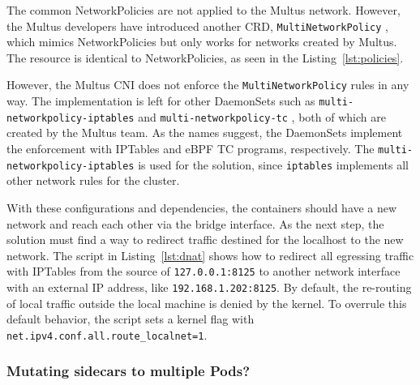 \documentclass[english, 12pt, a4paper, sci, utf8, a-2b, online]{aaltothesis}
\begin{document}


The common NetworkPolicies are not applied to the Multus network.
However, the Multus developers have introduced another CRD, \texttt{MultiNetworkPolicy} \cite{multi-network-policy}, which mimics NetworkPolicies but only works for networks created by Multus.
The resource is identical to NetworkPolicies, as seen in the Listing~\ref{lst:policies}.



However, the Multus CNI does not enforce the \texttt{MultiNetworkPolicy} rules in any way.
The implementation is left for other DaemonSets such as \texttt{multi-networkpolicy-iptables} \cite{multi-network-policy-iptables} and \texttt{multi-networkpolicy-tc} \cite{multi-network-policy-tc}, both of which are created by the Multus team.
As the names suggest, the DaemonSets implement the enforcement with IPTables and eBPF TC programs, respectively.
The \texttt{multi-networkpolicy-iptables} is used for the solution, since \texttt{iptables} implements all other network rules for the cluster.


With these configurations and dependencies, the containers should have a new network and reach each other via the bridge interface.
As the next step, the solution must find a way to redirect traffic destined for the localhost to the new network.
The script in Listing~\ref{lst:dnat} shows how to redirect all egressing traffic with IPTables from the source of \texttt{127.0.0.1:8125} to another network interface with an external IP address, like \texttt{192.168.1.202:8125}.
By default, the re-routing of local traffic outside the local machine is denied by the kernel.
To overrule this default behavior, the script sets a kernel flag with \lstinline{net.ipv4.conf.all.route_localnet=1}.



\subsubsection{Mutating sidecars to multiple Pods?}
\end{document}
